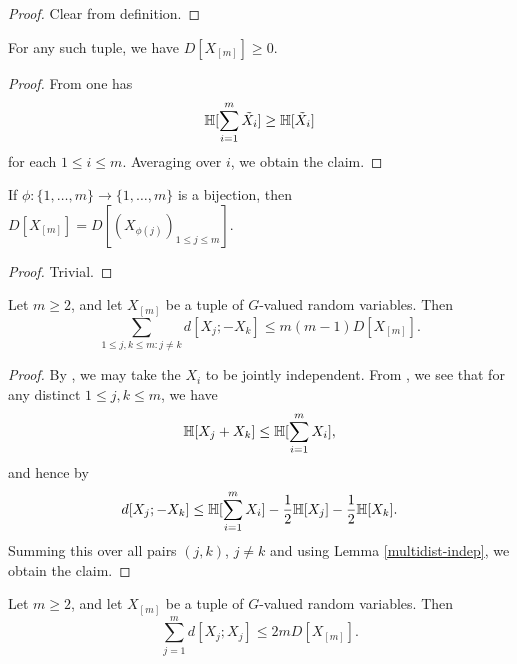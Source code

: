 \begin{proof}  Clear from definition.
\end{proof}

\begin{lemma}[Nonnegativity]\label{multidist-nonneg}\leanok  For any such tuple, we have $D[X_{[m]}] \geq 0$.
\end{lemma}

\begin{proof}  From  one has
$$ \mathbb{H}[\sum_{i =1}^m \tilde X_i] \geq \mathbb{H}[\tilde X_i]$$
for each $1 \leq i \leq m$.  Averaging over $i$, we obtain the claim.
\end{proof}

\begin{lemma}[Relabeling]\label{multidist-perm}\leanok If $\phi: \{1,\dots,m\} \to \{1,\dots,m\}$ is a bijection, then $D[X_{[m]}] = D[(X_{\phi(j)})_{1 \leq j \leq m}]$.
\end{lemma}

\begin{proof} Trivial.
\end{proof}

\begin{lemma}\label{multidist-ruzsa-I}\leanok
  Let $m \ge 2$, and let $X_{[m]}$ be a tuple of $G$-valued random variables. Then
  $$\sum_{1 \leq j,k \leq m: j \neq k} d[X_j; -X_k] \leq m(m-1) D[X_{[m]}].$$
\end{lemma}

\begin{proof}
By ,  we may take the $X_i$ to be jointly independent.  From , we see that for any distinct $1 \leq j,k \leq m$, we have
  \[
    \mathbb{H}[X_j+X_k] \leq \mathbb{H}[\sum_{i=1}^m X_i],
  \]
  and hence by 
  \[
    d[X_j;-X_k] \leq \mathbb{H}[\sum_{i=1}^m X_i] - \frac{1}{2} \mathbb{H}[X_j] - \frac{1}{2} \mathbb{H}[X_k].
  \]
  Summing this over all pairs $(j,k)$, $j \neq k$ and using Lemma \ref{multidist-indep}, we obtain the claim.
\end{proof}

\begin{lemma}\label{multidist-ruzsa-II}\leanok
  Let $m \ge 2$, and let $X_{[m]}$ be a tuple of $G$-valued random variables. Then
  $$\sum_{j=1}^m d[X_j;X_j] \leq 2 m D[X_{[m]}].$$
\end{lemma}

